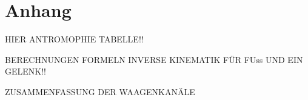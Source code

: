 \appendix                %

\setcounter{page}{1}
\section*{Anhang}%

HIER ANTROMOPHIE TABELLE!!

BERECHNUNGEN FORMELN INVERSE KINEMATIK FÜR FUss UND EIN GELENK!!

ZUSAMMENFASSUNG DER WAAGENKANÄLE
